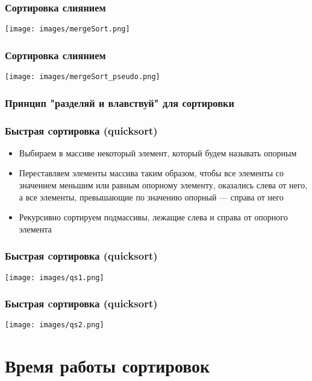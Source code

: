 \documentclass[12pt,pdf,hyperref={unicode}]{beamer}
\begin{document}
\begin{frame}[fragile]
\frametitle{Сортировка слиянием} 
\begin{center}
\texttt{[image: images/mergeSort.png]}
\end{center}
\end{frame}


\begin{frame}[fragile]
\frametitle{Сортировка слиянием} 
\begin{center}
\texttt{[image: images/mergeSort\_pseudo.png]}
\end{center}
\end{frame}



\begin{frame}[fragile]
\frametitle{Принцип "разделяй и влавствуй" для сортировки} 
\frametitle{Быстрая cортировка (quicksort)} 
\begin{itemize}
\item Выбираем в массиве некоторый элемент, который будем называть опорным \\
\item Переставляем элементы массива таким образом, чтобы все элементы со значением меньшим или равным опорному элементу, оказались слева от него, а все элементы, превышающие по значению опорный — справа от него \\
\item Рекурсивно сортируем подмассивы, лежащие слева и справа от опорного элемента\\
\end{itemize}
\end{frame}

\begin{frame}[fragile]
\frametitle{Быстрая cортировка (quicksort)} 
\begin{center}
\texttt{[image: images/qs1.png]}
\end{center}
\end{frame}

\begin{frame}[fragile]
\frametitle{Быстрая cортировка (quicksort)} 
\begin{center}
\texttt{[image: images/qs2.png]}
\end{center}
\end{frame}


\section{Время работы сортировок}
\end{document}
